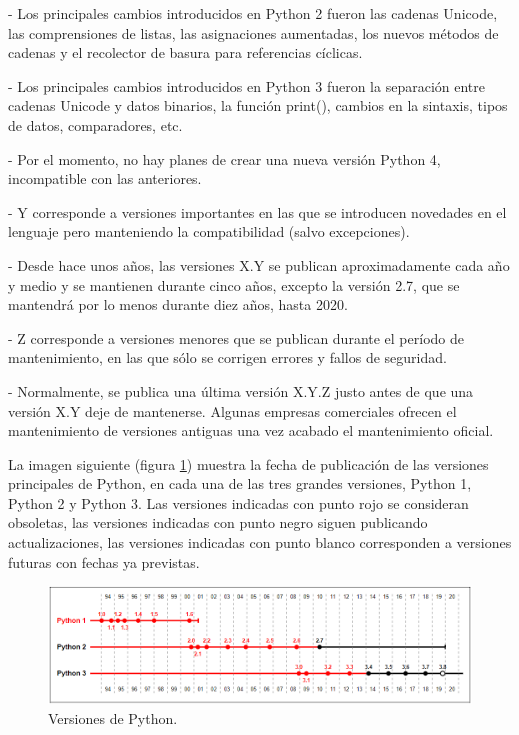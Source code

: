 - Los principales cambios introducidos en Python 2 fueron las cadenas Unicode, las comprensiones de listas, las asignaciones aumentadas, los nuevos métodos de cadenas y el recolector de basura para referencias cíclicas.

- Los principales cambios introducidos en Python 3 fueron la separación entre cadenas Unicode y datos binarios, la función print(), cambios en la sintaxis, tipos de datos, comparadores, etc.

- Por el momento, no hay planes de crear una nueva versión Python 4, incompatible con las anteriores.

- Y corresponde a versiones importantes en las que se introducen novedades en el lenguaje pero manteniendo la compatibilidad (salvo excepciones).

- Desde hace unos años, las versiones X.Y se publican aproximadamente cada año y medio y se mantienen durante cinco años, excepto la versión 2.7, que se mantendrá por lo menos durante diez años, hasta 2020.

- Z corresponde a versiones menores que se publican durante el período de mantenimiento, en las que sólo se corrigen errores y fallos de seguridad.

- Normalmente, se publica una última versión X.Y.Z justo antes de que una versión X.Y deje de mantenerse. Algunas empresas comerciales ofrecen el mantenimiento de versiones antiguas una vez acabado el mantenimiento oficial.

La imagen siguiente (figura \ref{fig:FotosPaginasWebHeliostatos/unnamed(7).png}) muestra la fecha de publicación de las versiones principales de Python, en cada una de las tres grandes versiones, Python 1, Python 2 y Python 3. Las versiones indicadas con punto rojo se consideran obsoletas, las versiones indicadas con punto negro siguen publicando actualizaciones, las versiones indicadas con punto blanco corresponden a versiones futuras con fechas ya previstas.

\begin{figure}[h!]
  	\centering
	\includegraphics[width=\textwidth]{FotosPaginasWebHeliostatos/unnamed(7).png}
	\caption{Versiones de Python.
	\label{fig:FotosPaginasWebHeliostatos/unnamed(7).png}}
\end{figure}

